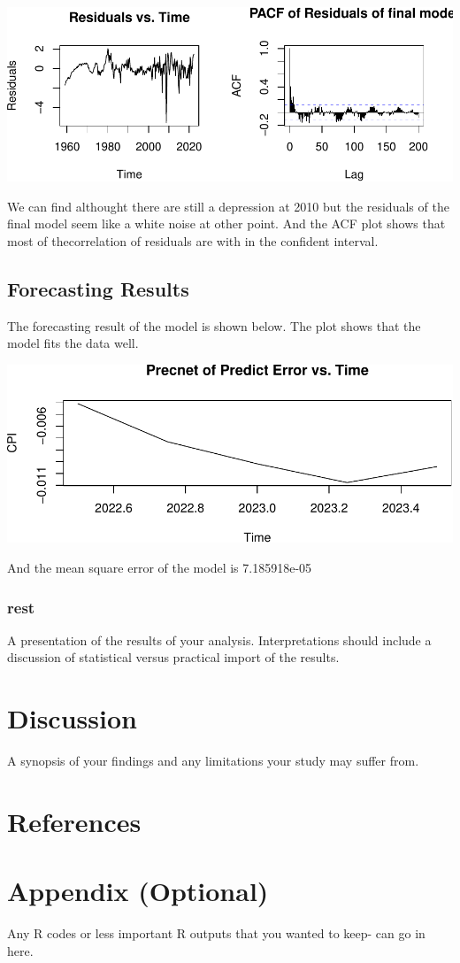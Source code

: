 \documentclass[
  man,floatsintext,
  man]{apa6}
\begin{document}
\includegraphics{stat429_group2_final_proj_files/figure-latex/unnamed-chunk-5-1.pdf}

We can find althought there are still a depression at 2010 but the residuals of the final model seem like a white noise at other point.
And the ACF plot shows that most of thecorrelation of residuals are with in the confident interval.

\subsection{Forecasting Results}\label{forecasting-results}

The forecasting result of the model is shown below. The plot shows that the model fits the data well.

\includegraphics{stat429_group2_final_proj_files/figure-latex/unnamed-chunk-6-1.pdf}

And the mean square error of the model is 7.185918e-05

\subsubsection{rest}\label{rest}

A presentation of the results of your analysis. Interpretations should include a discussion of statistical versus practical import of the results.

\section{Discussion}\label{discussion}

A synopsis of your findings and any limitations your study may suffer from.

\newpage

\section{References}\label{references}

\section{Appendix (Optional)}\label{appendix-optional}

Any R codes or less important R outputs that you wanted to keep- can go in here.


\printbibliography
\end{document}

